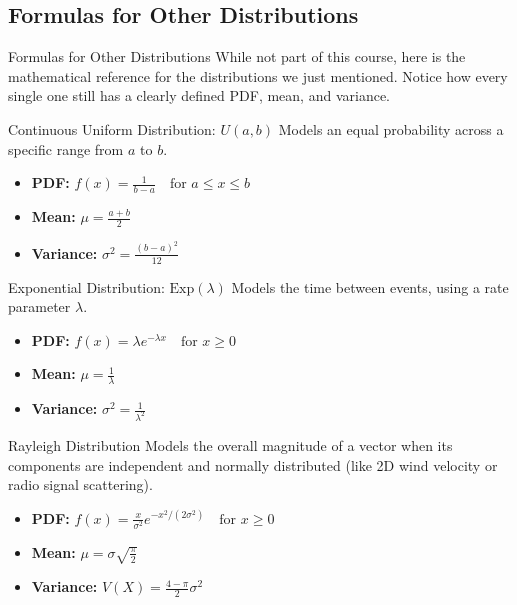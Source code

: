 \subsection{Formulas for Other Distributions}
\begin{frame}[allowframebreaks]{Formulas for Other Distributions}
    While not part of this course, here is the mathematical reference for the distributions we just mentioned. Notice how every single one still has a clearly defined PDF, mean, and variance.

    \vspace{0.2cm}
    \begin{block}{Continuous Uniform Distribution: $U(a, b)$}
        Models an equal probability across a specific range from $a$ to $b$.
        \begin{itemize}
            \item \textbf{PDF:} $f(x) = \frac{1}{b-a} \quad \text{for } a \leq x \leq b$
            \item \textbf{Mean:} $\mu = \frac{a+b}{2}$
            \item \textbf{Variance:} $\sigma^2 = \frac{(b-a)^2}{12}$
        \end{itemize}
    \end{block}

    \vspace{0.2cm}
    \begin{block}{Exponential Distribution: $\text{Exp}(\lambda)$}
        Models the time between events, using a rate parameter $\lambda$.
        \begin{itemize}
            \item \textbf{PDF:} $f(x) = \lambda e^{-\lambda x} \quad \text{for } x \geq 0$
            \item \textbf{Mean:} $\mu = \frac{1}{\lambda}$
            \item \textbf{Variance:} $\sigma^2 = \frac{1}{\lambda^2}$
        \end{itemize}
    \end{block}

    \framebreak

    \begin{block}{Rayleigh Distribution}
        Models the overall magnitude of a vector when its components are independent and normally distributed (like 2D wind velocity or radio signal scattering).
        \begin{itemize}
            \item \textbf{PDF:} $f(x) = \frac{x}{\sigma^2} e^{-x^2 / (2\sigma^2)} \quad \text{for } x \geq 0$
            \item \textbf{Mean:} $\mu = \sigma \sqrt{\frac{\pi}{2}}$
            \item \textbf{Variance:} $V(X) = \frac{4-\pi}{2}\sigma^2$
        \end{itemize}
    \end{block}


\end{frame}

